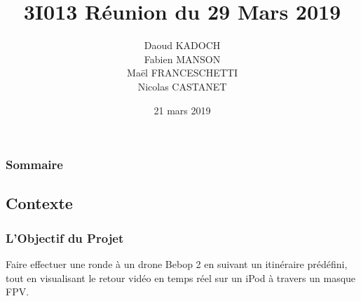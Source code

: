 \documentclass{beamer}
\title{3I013 Réunion du 29 Mars 2019}
\author{Daoud KADOCH\\Fabien MANSON\\Maël FRANCESCHETTI\\Nicolas CASTANET\\}
\begin{document}
	\begin{frame}
		\begin{center}
		\date{21 mars 2019}
		\maketitle
		\end{center}
	\end{frame}
	
	
	
	\begin{frame}
		\section{}
		\begin{flushleft}
		\frametitle{Sommaire}
		\tableofcontents{}
		\end{flushleft}
	\end{frame}
	
		\begin{frame}
	\section{Contexte}
		\begin{center}
		\frametitle{L'Objectif du Projet}
		   Faire effectuer une ronde à un drone Bebop 2 en suivant un itinéraire prédéfini, tout en visualisant le retour vidéo en temps réel sur un iPod à travers un masque FPV.
		\end{center}
	\end{frame}
	
\end{document}
